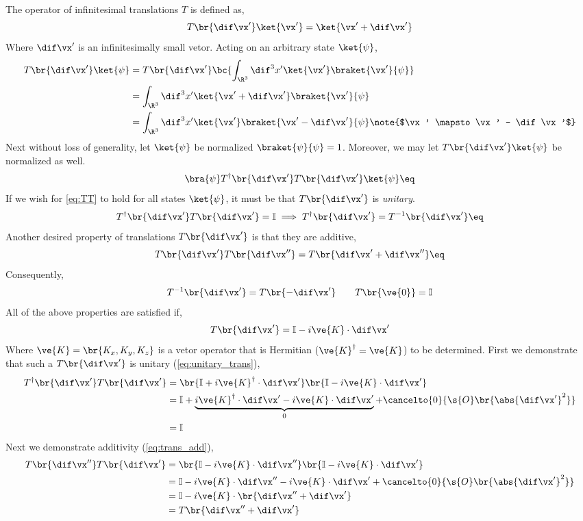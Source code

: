 \documentclass{article}
\begin{document}
The operator of infinitesimal translations $T$ is defined as,
\[ T\br{\dif \vx'}\ket{\vx'} = \ket{\vx' + \dif \vx'} \]
Where $\dif \vx'$ is an infinitesimally small vetor. Acting on an arbitrary state $\ket{\psi}$,
\begin{align*}
T\br{\dif \vx'}\ket{\psi} &= T\br{\dif \vx'} \bc{\int_{\R^3} \dif^3 x' \ket{\vx'} \braket{\vx'}{\psi}} \\
&= \int_{\R^3} \dif^3 x' \ket{\vx' + \dif \vx'} \braket{\vx'}{\psi} \\
&= \int_{\R^3} \dif^3 x' \ket{\vx'} \braket{\vx' - \dif \vx'}{\psi} \note{$\vx' \mapsto \vx' - \dif \vx'$}\\
\end{align*}
Next without loss of generality, let $\ket{\psi}$ be normalized $\braket{\psi}{\psi} = 1$. Moreover, we may let $T\br{\dif \vx'}\ket{\psi}$ be normalized as well.
\[ \bra{\psi}T^{\dagger}\br{\dif \vx'} T\br{\dif \vx'}\ket{\psi} \eq \label{eq:TT}\]
If we wish for \cref{eq:TT} to hold for all states $\ket{\psi}$, it must be that $T\br{\dif \vx'}$ is \textit{unitary}.
\[ T^{\dagger}\br{\dif \vx'} T\br{\dif \vx'} = \mathbb{I} \implies T^{\dagger}\br{\dif \vx'} = T^{-1}\br{\dif \vx'} \eq\label{eq:unitary_trans}\]
Another desired property of translations $T\br{\dif \vx'}$ is that they are additive,
\[ T\br{\dif \vx'}T\br{\dif \vx''} = T\br{\dif \vx' + \dif \vx''} \eq \label{eq:trans_add}\]
Consequently,
\[ T^{-1}\br{\dif \vx'} = T\br{-\dif \vx'} \qquad T\br{\ve{0}} = \mathbb{I} \]
All of the above properties are satisfied if,
\[ T\br{\dif \vx'} = \mathbb{I} - i \ve{K} \cdot \dif \vx' \]
Where $\ve{K} = \br{K_x, K_y, K_z}$ is a vetor operator that is Hermitian ($\ve{K}^{\dagger} = \ve{K}$) to be determined. First we demonstrate that such a $T\br{\dif \vx'}$ is unitary (\cref{eq:unitary_trans}),
\begin{align*}
T^{\dagger}\br{\dif \vx'} T\br{\dif \vx'} &= \br{\mathbb{I} + i \ve{K}^{\dagger} \cdot \dif \vx'}\br{\mathbb{I} - i \ve{K} \cdot \dif \vx'} \\
&= \mathbb{I} + \underbrace{i \ve{K}^{\dagger} \cdot \dif \vx' - i \ve{K} \cdot \dif \vx'}_{0} + \cancelto{0}{\s{O}\br{\abs{\dif \vx'}^2}} \\
&= \mathbb{I}
\end{align*}
Next we demonstrate additivity (\cref{eq:trans_add}),
\begin{align*}
T\br{\dif \vx''} T\br{\dif \vx'} &= \br{\mathbb{I} - i \ve{K} \cdot \dif \vx''}\br{\mathbb{I} - i \ve{K} \cdot \dif \vx'} \\
&= \mathbb{I} - i \ve{K} \cdot \dif \vx'' - i \ve{K} \cdot \dif \vx' + \cancelto{0}{\s{O}\br{\abs{\dif \vx'}^2}} \\
&= \mathbb{I} - i \ve{K} \cdot \br{\dif \vx'' + \dif \vx'} \\
&= T\br{\dif \vx'' + \dif \vx'}
\end{align*}
\end{document}
